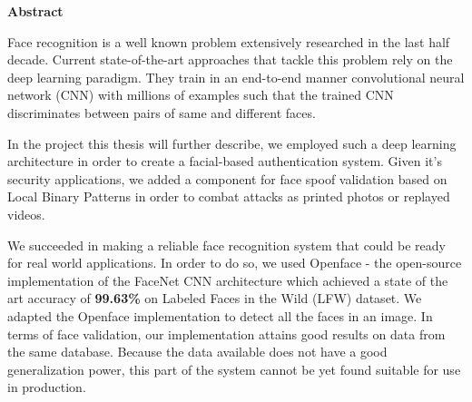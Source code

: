 \thispagestyle{plain}
\setlength{\parskip}{1.5em}

\vspace*{\fill}

\begin{center}
	\Large \textbf{Abstract}	
\end{center}

Face recognition is a well known problem extensively researched in the last half decade. Current state-of-the-art approaches that tackle this problem rely on the deep learning paradigm. They train in an end-to-end manner convolutional neural network (CNN) with millions of examples such that the trained CNN discriminates between pairs of same and different faces. 

In the project this thesis will further describe, we employed such a deep learning architecture in order to create a facial-based authentication system. Given it's security applications, we added a component for face spoof validation based on Local Binary Patterns in order to combat attacks as printed photos or replayed videos.

We succeeded in making a reliable face recognition system that could be ready for real world applications. In order to do so, we used Openface \cite{amos2016openface} - the open-source implementation of the FaceNet \cite{SchroffKP15} CNN architecture which achieved a state of the art accuracy of \textbf{99.63\%} on Labeled Faces in the Wild (LFW) dataset. We adapted the Openface implementation to detect all the faces in an image. In terms of face validation, our implementation attains good results on data from the same database. Because the data available does not have a good generalization power, this part of the system cannot be yet found suitable for use in production.

\vspace*{\fill}

